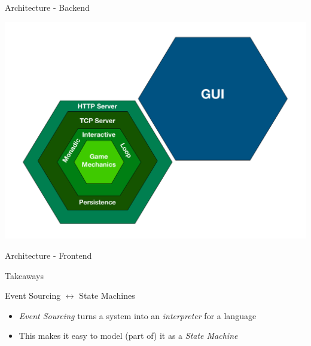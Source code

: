 \begin{frame}[fragile]{Architecture - Backend}
  \begin{center}
    \includegraphics[height=.8\textheight]{./images/archi-back.pdf}
  \end{center}
\end{frame}

\begin{frame}[fragile]{Architecture - Frontend}
\end{frame}


\begin{frame}[fragile]{Takeaways}
\end{frame}

\begin{frame}[fragile]{Event Sourcing $\leftrightarrow$ State Machines}
  \begin{itemize}[<+->]
  \item \emph{Event Sourcing} turns a system into an \emph{interpreter} for a language
  \item This makes it easy to model (part of) it as a \emph{State Machine}
  \end{itemize}
\end{frame}

